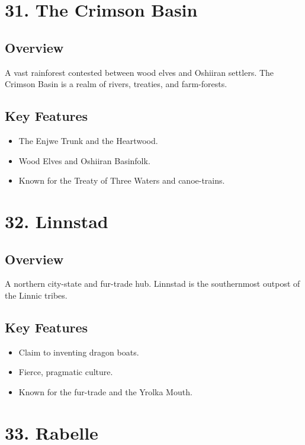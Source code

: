 \documentclass[11pt]{article}
\begin{document}
\section*{31. The Crimson Basin}

\subsection*{Overview}
A vast rainforest contested between wood elves and Oshiiran settlers. The Crimson Basin is a realm of rivers, treaties, and farm-forests.

\subsection*{Key Features}
\begin{itemize}[leftmargin=*]
    \item The Enjwe Trunk and the Heartwood.
    \item Wood Elves and Oshiiran Basinfolk.
    \item Known for the Treaty of Three Waters and canoe-trains.
\end{itemize}

\section*{32. Linnstad}

\subsection*{Overview}
A northern city-state and fur-trade hub. Linnstad is the southernmost outpost of the Linnic tribes.

\subsection*{Key Features}
\begin{itemize}[leftmargin=*]
    \item Claim to inventing dragon boats.
    \item Fierce, pragmatic culture.
    \item Known for the fur-trade and the Yrolka Mouth.
\end{itemize}

\section*{33. Rabelle}
\end{document}

